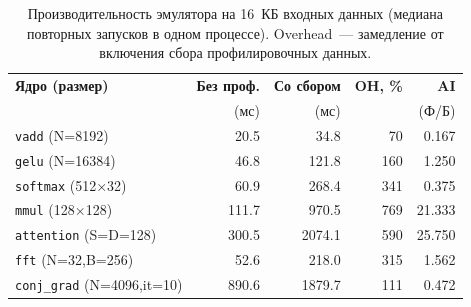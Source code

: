 \begin{table}[h]
  \caption{Производительность эмулятора на 16~КБ входных данных
           (медиана повторных запусков в одном процессе).
           Overhead~--- замедление от включения сбора профилировочных данных.}
  \label{tab:emu_bench_16k}
  \centering
  \footnotesize
  \begin{tabular}{lrrrr}
    \toprule
    \textbf{Ядро (размер)} & \textbf{Без проф.} & \textbf{Со сбором} & \textbf{OH, \%} & \textbf{AI} \\
                                   & (мс)     & (мс)     &          & (Ф/Б)  \\
    \midrule
    \texttt{vadd} (N=8192)                 &     20.5 &     34.8 &     70 &  0.167 \\
    \texttt{gelu} (N=16384)                &     46.8 &    121.8 &    160 &  1.250 \\
    \texttt{softmax} (512×32)              &     60.9 &    268.4 &    341 &  0.375 \\
    \texttt{mmul} (128×128)                &    111.7 &    970.5 &    769 & 21.333 \\
    \texttt{attention} (S=D=128)           &    300.5 &   2074.1 &    590 & 25.750 \\
    \texttt{fft} (N=32,B=256)              &     52.6 &    218.0 &    315 &  1.562 \\
    \texttt{conj\_grad} (N=4096,it=10)     &    890.6 &   1879.7 &    111 &  0.472 \\
    \bottomrule
  \end{tabular}
\end{table}
